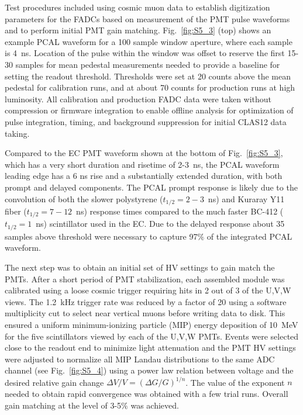 Test procedures included using cosmic muon data to establish digitization parameters for the FADCs based on
measurement of the PMT pulse waveforms and to perform initial PMT gain matching. Fig.~\ref{fig:S5_3} (top)
shows an example PCAL waveform for a 100 sample window aperture, where each sample is 4~ns. Location of the
pulse within the window was offset to reserve the first 15-30 samples for mean pedestal measurements needed
to provide a baseline for setting the readout threshold. Thresholds were set at 20 counts above the mean
pedestal for calibration runs, and at about 70 counts for production runs at high luminosity. All calibration and
production FADC data were taken without compression or firmware integration to enable offline analysis for
optimization of pulse integration, timing, and background suppression for initial CLAS12 data taking.

Compared to the EC PMT waveform shown at the bottom of Fig.~\ref{fig:S5_3}, which has a very short duration
and risetime of 2-3~ns, the PCAL waveform leading edge has a 6 ns rise and a substantially extended duration,
with both prompt and delayed components. The PCAL prompt response is likely due to the convolution of both
the slower polystyrene ($t_{1/2}=2-3$~ns) and Kuraray Y11 fiber ($t_{1/2}=7-12$~ns) response times compared
to the much faster BC-412 ($t_{1/2}=1$~ns) scintillator used in the EC. Due to the delayed response about 35
samples above threshold were necessary to capture 97$\%$ of the integrated PCAL waveform.  

The next step was to obtain an initial set of HV settings to gain match the PMTs. After a short period of PMT
stabilization, each assembled module was calibrated using a loose cosmic trigger requiring hits in 2 out of 3 of
the U,V,W views. The 1.2~kHz trigger rate was reduced by a factor of 20 using a software multiplicity cut to
select near vertical muons before writing data to disk. This ensured a uniform minimum-ionizing particle (MIP)
energy deposition of 10~MeV for the five scintillators viewed by each of the U,V,W PMTs. Events were selected
close to the readout end to minimize light attenuation and the PMT HV settings were adjusted to normalize all
MIP Landau distributions to the same ADC channel (see Fig.~\ref{fig:S5_4}) using a power law relation between
voltage and the desired relative gain change $\Delta V/V = (\Delta G/G)^{1/n}$. The value of the exponent $n$
needed to obtain rapid convergence was obtained with a few trial runs. Overall gain matching at the level of
3-5$\%$ was achieved.

